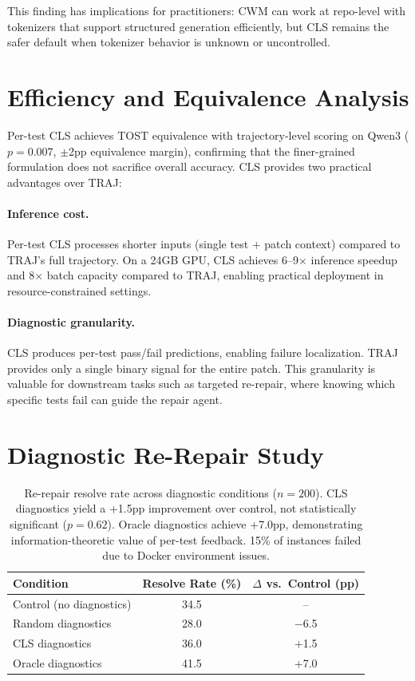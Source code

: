 \documentclass[11pt]{article}
\begin{document}
This finding has implications for practitioners: CWM can work at repo-level with tokenizers that support structured generation efficiently, but CLS remains the safer default when tokenizer behavior is unknown or uncontrolled.

\section{Efficiency and Equivalence Analysis}
\label{sec:efficiency}

Per-test CLS achieves TOST equivalence with trajectory-level scoring on Qwen3 ($p{=}0.007$, $\pm$2pp equivalence margin), confirming that the finer-grained formulation does not sacrifice overall accuracy. CLS provides two practical advantages over TRAJ:

\paragraph{Inference cost.} Per-test CLS processes shorter inputs (single test + patch context) compared to TRAJ's full trajectory. On a 24GB GPU, CLS achieves 6--9$\times$ inference speedup and 8$\times$ batch capacity compared to TRAJ, enabling practical deployment in resource-constrained settings.

\paragraph{Diagnostic granularity.} CLS produces per-test pass/fail predictions, enabling failure localization. TRAJ provides only a single binary signal for the entire patch. This granularity is valuable for downstream tasks such as targeted re-repair, where knowing which specific tests fail can guide the repair agent.

\section{Diagnostic Re-Repair Study}
\label{sec:rerepair}

\begin{table}[t]
\centering
\small
\begin{tabular}{lcc}
\toprule
\textbf{Condition} & \textbf{Resolve Rate (\%)} & \textbf{$\Delta$ vs.\ Control (pp)} \\
\midrule
Control (no diagnostics)  & 34.5 & -- \\
Random diagnostics        & 28.0 & $-$6.5 \\
CLS diagnostics           & 36.0 & +1.5 \\
Oracle diagnostics        & 41.5 & +7.0 \\
\bottomrule
\end{tabular}
\caption{Re-repair resolve rate across diagnostic conditions ($n{=}200$). CLS diagnostics yield a +1.5pp improvement over control, not statistically significant ($p{=}0.62$). Oracle diagnostics achieve +7.0pp, demonstrating information-theoretic value of per-test feedback. 15\% of instances failed due to Docker environment issues.}
\label{tab:rerepair}
\end{table}
\end{document}
